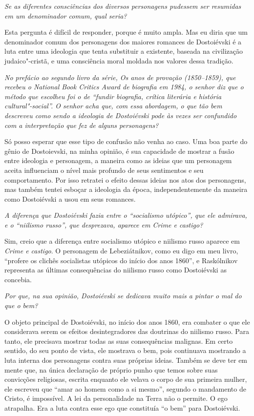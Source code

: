 \medskip

\emph{Se as diferentes consciências dos diversos personagens pudessem ser
resumidas em um denominador comum, qual seria?}

Esta pergunta é difícil de responder, porque é muito ampla. Mas eu diria
que um denominador comum dos personagens dos maiores romances de
Dostoiévski é a luta entre uma ideologia que tenta substituir a
existente, baseada na civilização judaico"-cristã, e uma consciência
moral moldada nos valores dessa tradição.

\medskip

\emph{No prefácio ao segundo livro da série, \emph{Os anos de provação (1850--1859)}, que recebeu o \emph{National Book Critics Award} de biografia em 1984, o
senhor diz que o método que escolheu foi o de ``fundir biografia, crítica
literária e história cultural"-social''. O senhor acha que, com essa
abordagem, o que tão bem descreveu como sendo a ideologia de
Dostoiévski pode às vezes ser confundido com a interpretação que
fez de alguns personagens?}

Só posso esperar que esse tipo de confusão não venha ao caso.
Uma boa parte do gênio de Dostoievski, na minha opinião, é sua
capacidade de mostrar a fusão entre ideologia e personagem, a maneira
como as ideias que um personagem aceita influenciam o nível mais
profundo de seus sentimentos e seu comportamento. Por isso retratei o
efeito dessas ideias nos atos dos personagens, mas também tentei esboçar
a ideologia da época, independentemente da maneira como Dostoiévski a
usou em seus romances.

\medskip

\emph{A diferença que Dostoiévski fazia entre o ``socialismo utópico'', que
ele admirava, e o ``niilismo russo'', que desprezava, aparece em \emph{Crime e
castigo}?}

Sim, creio que a diferença entre socialismo utópico e niilismo russo
aparece em \emph{Crime e castigo}. O personagem de Lebeziátnikov, como eu
digo em meu livro, ``profere os clichês socialistas utópicos do início
dos anos 1860'', e Raskólnikov representa as últimas consequências do
niilismo russo como Dostoiévski as concebia.

\medskip

\emph{Por que, na sua opinião, Dostoiévski se dedicava muito mais a pintar
o mal do que o bem?}

O objeto principal de Dostoiévski, no início dos anos 1860, era combater
o que ele considerava serem os efeitos desintegradores das doutrinas do
niilismo russo. Para tanto, ele precisava mostrar todas as suas
consequências malignas. Em certo sentido, do seu ponto de vista, ele
mostrava o bem, pois continuava mostrando a luta interna dos personagens
contra suas próprias ideias. Também se deve ter em mente que, na única
declaração de próprio punho que temos sobre suas convicções religiosas,
escrita enquanto ele velava o corpo de sua primeira mulher, ele escreveu
que ``amar ao homem como a si mesmo'', segundo o mandamento de Cristo, é
impossível. A lei da personalidade na Terra não o permite. O
ego atrapalha. Era a luta contra esse ego que constituía ``o bem'' para
Dostoiévski.

